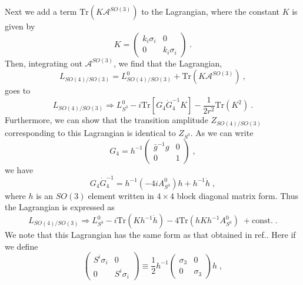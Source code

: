 \documentclass[12pt,a4paper]{article}
\begin{document}
Next we add a term $\mathrm{Tr}(K\mathcal{A}^{SO(3)})$ to the Lagrangian,
where the constant $K$ is given by 
\begin{equation}
K=\left( 
\begin{array}{cc}
k_{i}\sigma _{i} & 0 \\ 
0 & k_{i}\sigma _{i}
\end{array}
\right) \;.
\end{equation}
Then, integrating out $\mathcal{A}^{SO(3)}$, we find that the Lagrangian, 
\begin{equation}
L_{SO(4)/SO(3)}=L_{SO(4)/SO(3)}^{0}+\mathrm{Tr}(K\mathcal{A}^{SO(3)})\ ,
\end{equation}
goes to 
\begin{equation}
L_{SO(4)/SO(3)}\Rightarrow L_{S^{3}}^{0}-i\mathrm{Tr}\left[ G_{4}\dot{G}%
_{4}^{-1}K\right] -{\frac{1}{2r^{2}}}\mathrm{Tr}(K^{2})\ .
\end{equation}
Furthermore, we can show that the transition amplitude $Z_{SO(4)/SO(3)}$
corresponding to this Lagrangian is identical to $Z_{S^{3}}$. As we can write%
%
%
%
%
%
%
%
%
%
%
\begin{equation}
G_{4}=h^{-1}\left( 
\begin{array}{cc}
\bar{g}^{-1}g & 0 \\ 
0 & 1
\end{array}
\right) \;,
\end{equation}
we have 
\begin{equation}
G_{4}\dot{G}_{4}^{-1}=h^{-1}(-4iA_{S^{3}}^{0})h+h^{-1}\dot{h}\;,
\end{equation}
where $h$ is an $SO(3)\;$element written in $4\times 4$ block diagonal
matrix form. Thus the Lagrangian is expressed as 
\begin{equation}
L_{SO(4)/SO(3)}\Rightarrow L_{S^{3}}^{0}-i\mathrm{Tr}(Kh^{-1}\dot{h})-4%
\mathrm{Tr}(hKh^{-1}A_{S^{3}}^{0})\;+\mathrm{const.\;}.
\end{equation}
We note that this Lagrangian has the same form as that obtained in ref.\cite
{McMullan:1995wz}. Here if we define 
\begin{equation}
\left( 
\begin{array}{cc}
S^{i}\sigma _{i} & 0 \\ 
0 & S^{i}\sigma _{i}
\end{array}
\right) \equiv \frac{1}{2}h^{-1}\left( 
\begin{array}{cc}
\sigma _{3} & 0 \\ 
0 & \sigma _{3}
\end{array}
\right) h\;,
\end{equation}
\end{document}
